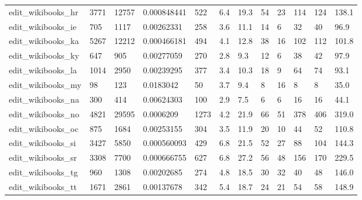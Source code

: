 \begin{longtable}{llllllllllll}
 edit\_wikibooks\_hr                                  & 3771       & 12757     & 0.000848441 & 522   & 6.4    & 19.3   & 54    & 23     & 114    & 124    & 138.1   \\
 edit\_wikibooks\_ie                                  & 705        & 1117      & 0.00262331  & 258   & 3.6    & 11.1   & 14    & 6      & 32     & 40     & 96.9    \\
 edit\_wikibooks\_ka                                  & 5267       & 12212     & 0.000466181 & 494   & 4.1    & 12.8   & 38    & 16     & 102    & 112    & 101.8   \\
 edit\_wikibooks\_ky                                  & 647        & 905       & 0.00277059  & 270   & 2.8    & 9.3    & 12    & 6      & 38     & 42     & 97.9    \\
 edit\_wikibooks\_la                                  & 1014       & 2950      & 0.00239295  & 377   & 3.4    & 10.3   & 18    & 9      & 64     & 74     & 93.1    \\
 edit\_wikibooks\_my                                  & 98         & 123       & 0.0183042   & 50    & 3.7    & 9.4    & 8     & 16     & 8      & 8      & 35.0    \\
 edit\_wikibooks\_na                                  & 300        & 414       & 0.00624303  & 100   & 2.9    & 7.5    & 6     & 6      & 16     & 16     & 44.1    \\
 edit\_wikibooks\_no                                  & 4821       & 29595     & 0.0006209   & 1273  & 4.2    & 21.9   & 66    & 51     & 378    & 406    & 319.0   \\
 edit\_wikibooks\_oc                                  & 875        & 1684      & 0.00253155  & 304   & 3.5    & 11.9   & 20    & 10     & 44     & 52     & 110.8   \\
 edit\_wikibooks\_si                                  & 3427       & 5850      & 0.000560093 & 429   & 6.8    & 21.5   & 52    & 27     & 88     & 104    & 144.3   \\
 edit\_wikibooks\_sr                                  & 3308       & 7700      & 0.000666755 & 627   & 6.8    & 27.2   & 56    & 48     & 156    & 170    & 229.5   \\
 edit\_wikibooks\_tg                                  & 960        & 1308      & 0.00202685  & 274   & 4.8    & 18.5   & 30    & 32     & 40     & 48     & 146.0   \\
 edit\_wikibooks\_tt                                  & 1671       & 2861      & 0.00137678  & 342   & 5.4    & 18.7   & 24    & 21     & 54     & 58     & 148.9   \\

\end{longtable}
